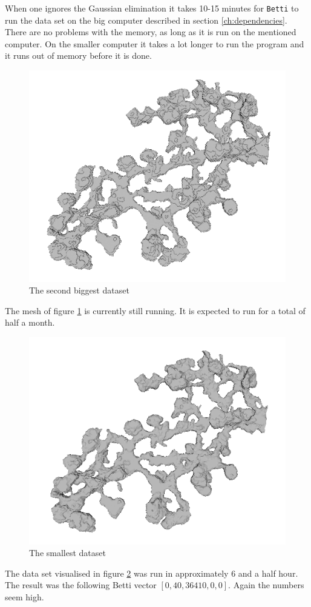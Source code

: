 \documentclass[11pt,a4paper,twoside, openright]{report}
\begin{document}
When one ignores the Gaussian elimination it takes 10-15 minutes for \texttt{Betti} to run the data set on the big computer described in section \ref{ch:dependencies}. There are no problems with the memory, as long as it is run on the mentioned computer. On the smaller computer it takes a lot longer to run the program and it runs out of memory before it is done.
\begin{figure}[H]
\center
\includegraphics[scale=0.5]{testmesh2d00.png}
\caption{The second biggest dataset}
\label{fig:mesh_2d}
\end{figure}
The mesh of figure \ref{fig:mesh_2d} is currently still running. It is expected to run for a total of half a month.

\begin{figure}[H]
\center
\includegraphics[scale=0.5]{testmesh00.png}
\caption{The smallest dataset}
\label{fig:mesh_}
\end{figure}
The data set visualised in figure \ref{fig:mesh_} was run in approximately 6 and a half hour. The result was the following Betti vector $[0,40,36410,0,0]$. Again the numbers seem high.
\end{document}
